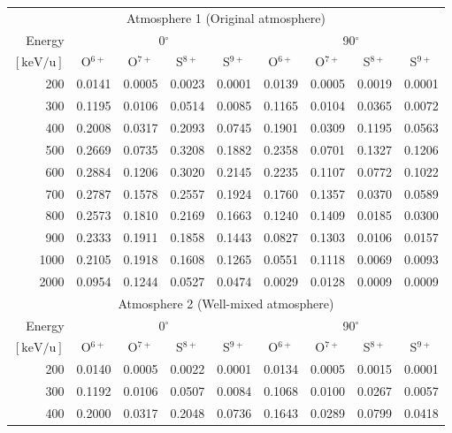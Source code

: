 \documentclass[draft]{agujournal2018}
\begin{document}
\begin{table}[ht]
    \centering
    \begin{tabular}{r|c|c|c|c|c|c|c|c}
    \multicolumn{9}{c}{Atmosphere 1 (Original atmosphere)} \\ \cline{2-9}
    Energy  & \multicolumn{4}{c|}{0$^\circ$} & \multicolumn{4}{c}{90$^\circ$} \\ \cline{2-9}
    $\mathrm{[keV/u]}$ & O$^{6+}$ & O$^{7+}$ & S$^{8+}$ & S$^{9+}$ & O$^{6+}$ & O$^{7+}$ & S$^{8+}$ & S$^{9+}$ \\ \cline{1-9}
    200      & 0.0141 & 0.0005 & 0.0023 & 0.0001 & 0.0139 & 0.0005 & 0.0019 & 0.0001 \\
    300      & 0.1195 & 0.0106 & 0.0514 & 0.0085 & 0.1165 & 0.0104 & 0.0365 & 0.0072 \\
    400      & 0.2008 & 0.0317 & 0.2093 & 0.0745 & 0.1901 & 0.0309 & 0.1195 & 0.0563 \\
    500      & 0.2669 & 0.0735 & 0.3208 & 0.1882 & 0.2358 & 0.0701 & 0.1327 & 0.1206 \\
    600      & 0.2884 & 0.1206 & 0.3020 & 0.2145 & 0.2235 & 0.1107 & 0.0772 & 0.1022 \\
    700      & 0.2787 & 0.1578 & 0.2557 & 0.1924 & 0.1760 & 0.1357 & 0.0370 & 0.0589 \\
    800      & 0.2573 & 0.1810 & 0.2169 & 0.1663 & 0.1240 & 0.1409 & 0.0185 & 0.0300 \\
    900      & 0.2333 & 0.1911 & 0.1858 & 0.1443 & 0.0827 & 0.1303 & 0.0106 & 0.0157 \\
    1000     & 0.2105 & 0.1918 & 0.1608 & 0.1265 & 0.0551 & 0.1118 & 0.0069 & 0.0093 \\
    2000     & 0.0954 & 0.1244 & 0.0527 & 0.0474 & 0.0029 & 0.0128 & 0.0009 & 0.0009 \\
    \hline
    \multicolumn{9}{c}{Atmosphere 2 (Well-mixed atmosphere)} \\ \cline{2-9}
    Energy  & \multicolumn{4}{c|}{0$^\circ$} & \multicolumn{4}{c}{90$^\circ$} \\ \cline{2-9}
    $\mathrm{[keV/u]}$ & O$^{6+}$ & O$^{7+}$ & S$^{8+}$ & S$^{9+}$ & O$^{6+}$ & O$^{7+}$ & S$^{8+}$ & S$^{9+}$ \\ \cline{1-9}
    200      & 0.0140 & 0.0005 & 0.0022	& 0.0001 & 0.0134 & 0.0005 & 0.0015 & 0.0001 \\
    300      & 0.1192 & 0.0106 & 0.0507	& 0.0084 & 0.1068 & 0.0100 & 0.0267 & 0.0057 \\
    400      & 0.2000 & 0.0317 & 0.2048	& 0.0736 & 0.1643 & 0.0289 & 0.0799 & 0.0418 \\

\end{tabular}
\end{table}
\end{document}
